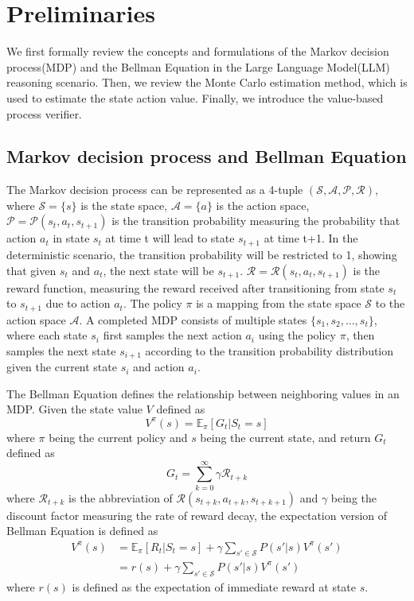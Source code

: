 \section{Preliminaries}
We first formally review the concepts and formulations of the Markov decision process(MDP) and the Bellman Equation in the Large Language Model(LLM) reasoning scenario. Then, we review the Monte Carlo estimation method, which is used to estimate the state action value. Finally, we introduce the value-based process verifier.

\subsection{Markov decision process and Bellman Equation}\label{sec:mdp}
The Markov decision process can be represented as a 4-tuple $(\mathcal{S}, \mathcal{A}, \mathcal{P}, \mathcal{R})$, where $\mathcal{S}=\{s\}$ is the state space, $\mathcal{A}=\{a\}$ is the action space, $\mathcal{P}=\mathcal{P}(s_t,a_t,s_{t+1})$ is the transition probability measuring the probability that action $a_t$ in state $s_t$ at time t will lead to state $s_{t+1}$ at time t+1. In the deterministic scenario, the transition probability will be restricted to 1, showing that given $s_t$ and $a_{t}$, the next state will be $s_{t+1}$. $\mathcal{R}=\mathcal{R}(s_t,a_t,s_{t+1})$ is the reward function, measuring the reward received after transitioning from state $s_t$ to $s_{t+1}$ due to action $a_t$. The policy $\pi$ is a mapping from the state space $\mathcal{S}$ to the action space $\mathcal{A}$. A completed MDP consists of multiple states $\{s_1,s_2,...,s_t\}$, where each state $s_i$ first samples the next action $a_i$ using the policy $\pi$, then samples the next state $s_{i+1}$ according to the transition probability distribution given the current state $s_i$ and action $a_i$.

The Bellman Equation defines the relationship between neighboring values in an MDP. Given the state value $V$ defined as 
\begin{equation}\label{pre:value_def}
    V^{\pi}(s)=\mathbb{E}_{\pi}[G_t|S_t=s]
\end{equation}
where $\pi$ being the current policy and $s$ being the current state, and return $G_t$ defined as
\begin{equation}
    G_t=\sum_{k=0}^{\infty}\gamma \mathcal{R}_{t+k}
\end{equation}
where $\mathcal{R}_{t+k}$ is the abbreviation of $\mathcal{R}(s_{t+k},a_{t+k},s_{t+k+1})$ and $\gamma$ being the discount factor measuring the rate of reward decay, the expectation version of Bellman Equation is defined as
\begin{equation}\label{pre:bellman_raw}
\begin{aligned}
    V^{\pi}(s)&=\mathbb{E}_{\pi}[R_t|S_t=s]+\gamma\sum_{s'\in \mathcal{S}}P(s'|s)V^\pi(s') \\
    &=r(s)+\gamma\sum_{s'\in \mathcal{S}}P(s'|s)V^\pi(s')
\end{aligned}
\end{equation}
where $r(s)$ is defined as the expectation of immediate reward at state $s$.

